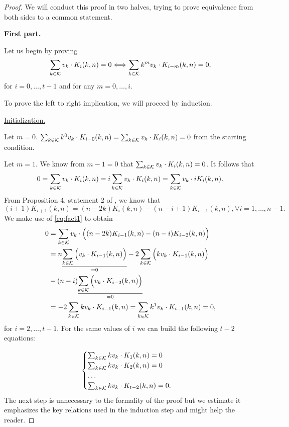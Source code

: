 \begin{proof}
    We will conduct this proof in two halves, trying to prove equivalence from both sides to a common statement.

    \textbf{First part.}

    Let us begin by proving
    $$\sum_{k \in \mathcal{K}} v_k \cdot K_i(k, n) = 0 \Longleftrightarrow \sum_{k \in \mathcal{K}} k^mv_k \cdot K_{i-m}(k, n) = 0,$$ for $i = 0, \ldots, t-1$ and for any $m = 0, \ldots, i$.

    To prove the left to right implication, we will proceed by induction.

    \underline{Initialization.}

    Let $m = 0$. $\sum_{k \in \mathcal{K}} k^0v_k \cdot K_{i-0}(k, n) = \sum_{k \in \mathcal{K}} v_k \cdot K_i(k, n) = 0$ from the starting condition.

    Let $m = 1$. We know from $m - 1 = 0$ that $\sum_{k \in \mathcal{K}} v_k \cdot K_i(k, n) = 0$. It follows that
    $$
    0 = \sum_{k \in \mathcal{K}} v_k \cdot K_i(k, n) = i\sum_{k \in \mathcal{K}} v_k \cdot K_i(k, n) = \sum_{k \in \mathcal{K}} v_k \cdot iK_i(k, n).
    $$
    From Proposition 4, statement 2 of \cite{DCC:DalMaiSar06}, we know that
    \begin{equation}\label{eq:fact1}
        (i+1)K_{i+1}(k, n) = (n - 2k)K_i(k,n) - (n - i + 1)K_{i-1}(k,n), \forall i = 1, \ldots, n - 1.
    \end{equation}
    We make use of \cref{eq:fact1} to obtain
    \begin{equation*}
    \begin{split}
        0 &= \sum_{k \in \mathcal{K}} v_k \cdot \Big( (n - 2k)K_{i-1}(k, n) - (n - i)K_{i-2}(k, n) \Big)\\
        & = n \underset{=0}{\underline{\sum_{k \in \mathcal{K}} \Big( v_k \cdot K_{i-1}(k, n) \Big)}} - 2\sum_{k \in \mathcal{K}} \Big( kv_k \cdot K_{i-1}(k, n) \Big)\\& - (n-i)\underset{=0}{\underline{\sum_{k \in \mathcal{K}} \Big( v_k \cdot K_{i-2}(k, n) \Big)}}\\
        &= -2\sum_{k \in \mathcal{K}} kv_k \cdot K_{i-1}(k, n) = \sum_{k \in \mathcal{K}} k^1v_k \cdot K_{i-1}(k, n) = 0,
    \end{split}
    \end{equation*}
    for $i = 2, \ldots, t-1$. For the same values of $i$ we can build the following $t-2$ equations:

    \begin{equation*}
        \begin{cases}
            \sum_{k \in \mathcal{K}} kv_k \cdot K_1(k, n) = 0\\
            \sum_{k \in \mathcal{K}} kv_k \cdot K_2(k, n) = 0\\
            \ldots\\
            \sum_{k \in \mathcal{K}} kv_k \cdot K_{t-2}(k, n) = 0.\\
        \end{cases}
    \end{equation*}
    The next step is unnecessary to the formality of the proof but we estimate it emphasizes the key relations used in the induction step and might help the reader.


\end{proof}
